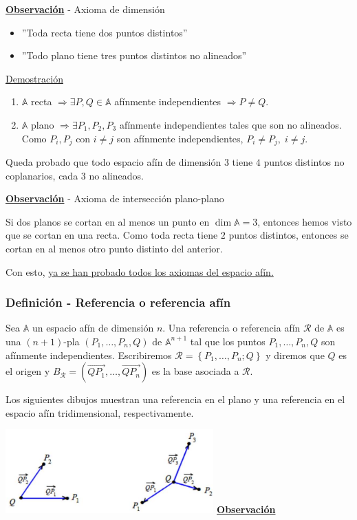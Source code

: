 \documentclass[12pt, a4paper, ones, notitlepage, openany,titlepage]{article}
\newcommand{\demostracion}{\noindent\underline{Demostración}}
\newcommand{\observacion}{\noindent\underline{\textbf{Observación}}}
\begin{document}
\observacion \; - Axioma de dimensión
\begin{itemize}
	\item ''Toda recta tiene dos puntos distintos''
	\item ''Todo plano tiene tres puntos distintos no alineados''
\end{itemize}
\demostracion
\begin{enumerate}
	\item $\mathbb{A}$ recta $\Longrightarrow \exists P,Q \in \mathbb{A}$ afínmente independientes $\Longrightarrow P \neq Q$.
	\item $\mathbb{A}$ plano $\Longrightarrow \exists P_1, P_2, P_3$ afínmente independientes tales que son no alineados. Como $P_i, P_j$ con $i \neq j$ son afínmente independientes, $P_i \neq P_j, \; i \neq j$.
\end{enumerate}
Queda probado que todo espacio afín de dimensión $3$ tiene $4$ puntos distintos no coplanarios, cada $3$ no alineados.

\observacion \; - Axioma de intersección plano-plano

Si dos planos se cortan en al menos un punto en $\dim \mathbb{A} = 3$, entonces hemos visto que se cortan en una recta. Como toda recta tiene $2$ puntos distintos, entonces se cortan en al menos otro punto distinto del anterior.

\noindent Con esto, \underline{ya se han probado todos los axiomas del espacio afín.}

\subsubsection{Definición - Referencia o referencia afín}
Sea $\mathbb{A}$ un espacio afín de dimensión $n$. Una referencia o referencia afín $\mathcal{R}$ de $\mathbb{A}$ es una $(n+1)$-pla $\left(P_{1}, \ldots, P_{n}, Q\right)$ de $\mathbb{A}^{n+1}$ tal que los puntos $P_{1}, \ldots, P_{n}, Q$ son afínmente independientes. Escribiremos $\mathcal{R}=\left\{P_{1}, \ldots, P_{n} ; Q\right\}$ y diremos que $Q$ es el origen y $B_{\mathcal{R}}=\left(\overrightarrow{Q P_{1}}, \ldots, \overrightarrow{Q P_{n}}\right)$ es la base asociada a $\mathcal{R}$.

Los siguientes dibujos muestran una referencia en el plano y una referencia en el espacio afín tridimensional, respectivamente.

\includegraphics[max width=8cm, center]{2023_03_01_7659aec5e35f9a9b2d3cg-11}
\observacion
\end{document}
